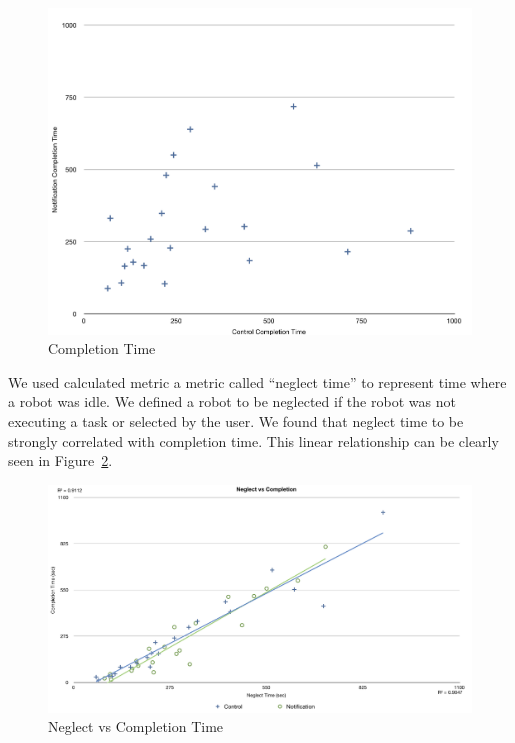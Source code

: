 \begin{figure}[ht]
\begin{center}
\includegraphics[width=5in]{images/results-completion-graph.png}
\caption{Completion Time\label{fig:completion-noxp}}
\end{center}
\end{figure}

We used calculated metric a metric called ``neglect time'' to represent time where a robot was idle. We defined a robot to be neglected if the robot was not executing a task or selected by the user. We found that neglect time to be strongly correlated with completion time. This linear relationship can be clearly seen in Figure~\ref{fig:neglect}.

\begin{figure}[ht]
\begin{center}
\includegraphics[width=5in]{images/results-neglect-graph.png}
\caption{Neglect vs Completion Time\label{fig:neglect}}
\end{center}
\end{figure}
